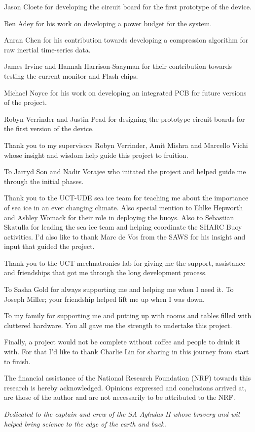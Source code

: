 \documentclass[a4paper, 12pt, oneside, openright, parskip=full]{book}
\newcommand{\nrf}									   
{	
The financial assistance of the National Research Foundation (NRF) towards this research is hereby acknowledged. Opinions expressed and conclusions arrived at, are those of the author and are not necessarily to be attributed to the NRF.
}
\begin{document}
Jason Cloete for developing the circuit board for the first prototype of the device.

Ben Adey for his work on developing a power budget for the system. 

Anran Chen for his contribution towards developing a compression algorithm for raw inertial time-series data.

James Irvine and Hannah Harrison-Saayman for their contribution towards testing the current monitor and Flash chips.

Michael Noyce for his work on developing an integrated PCB for future versions of the project.

Robyn Verrinder and Justin Pead for designing the prototype circuit boards for the first version of the device.

Thank you to my supervisors Robyn Verrinder, Amit Mishra and Marcello Vichi whose insight and wisdom help guide this project to fruition.

To Jarryd Son and Nadir Vorajee who initated the project and helped guide me through the initial phases. 
 
Thank you to the UCT-UDE sea ice team for teaching me about the importance of sea ice in an ever changing climate. Also special mention to Ehlke Hepworth and Ashley Womack for their role in deploying the buoys. Also to Sebastian Skatulla for leading the sea ice team and helping coordinate the SHARC Buoy activities. I'd also like to thank Marc de Vos from the SAWS for his insight and input that guided the project.

Thank you to the UCT mechnatronics lab for giving me the support, assistance and friendships that got me through the long development process. 

To Sasha Gold for always supporting me and helping me when I need it. To Joseph Miller; your friendship helped lift me up when I was down.

To my family for supporting me and putting up with rooms and tables filled with cluttered hardware. You all gave me the strength to undertake this project.

Finally, a project would not be complete without coffee and people to drink it with. For that I'd like to thank Charlie Lin for sharing in this journey from start to finish.

\nrf
\begin{flushright}
	\centering
	\vspace*{10cm}
	{\itshape Dedicated to the captain and crew of the SA Aghulas II whose bravery and wit helped bring science to the edge of the earth and back.\\}
\end{flushright}
\tableofcontents
\end{document}
